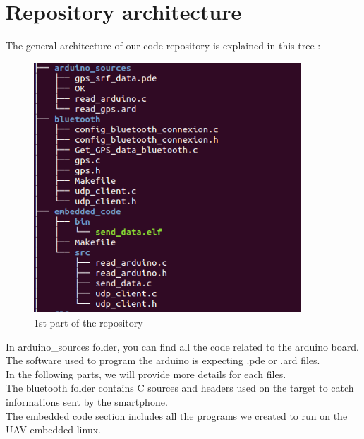 \section{Repository architecture}

The general architecture of our code repository is explained in this tree :\\

\begin{figure}[!h] 
\begin{center}
\includegraphics[width=10cm]{imgs/c1.png}
\caption{1st part of the repository} 
\label{img1} 
\end{center}
\end{figure} 

In arduino\_sources folder, you can find all the code related to the arduino board.
The software used to program the arduino is expecting .pde or .ard files.\\

In the following parts, we will provide more details for each files.\\

The bluetooth folder contains C sources and headers used on the target to catch informations sent by the smartphone.\\

The embedded code section includes all the programs we created to run on the UAV embedded linux.\\

\newpage

